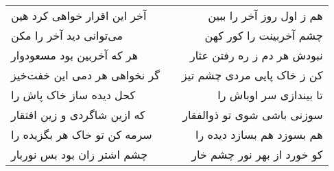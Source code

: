 \begin{center}
\begin{longtable}{l p{0.5cm} r}
آخر این اقرار خواهی کرد هین
&&
هم ز اول روز آخر را ببین
\\
می‌توانی دید آخر را مکن
&&
چشم آخربینت را کور کهن
\\
هر که آخربین بود مسعودوار
&&
نبودش هر دم ز ره رفتن عثار
\\
گر نخواهی هر دمی این خفت‌خیز
&&
کن ز خاک پایی مردی چشم تیز
\\
کحل دیده ساز خاک پاش را
&&
تا بیندازی سر اوباش را
\\
که ازین شاگردی و زین افتقار
&&
سوزنی باشی شوی تو ذوالفقار
\\
سرمه کن تو خاک هر بگزیده را
&&
هم بسوزد هم بسازد دیده را
\\
چشم اشتر زان بود بس نوربار
&&
کو خورد از بهر نور چشم خار
\\
\end{longtable}
\end{center}

